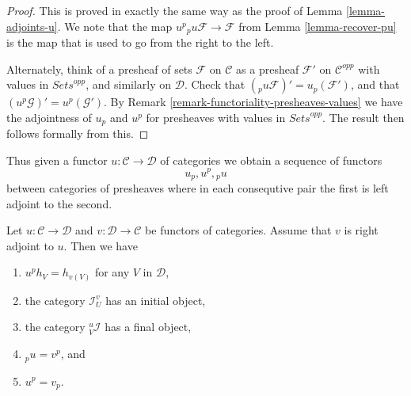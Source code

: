 \begin{proof}
This is proved in exactly the same way as the proof
of Lemma \ref{lemma-adjoints-u}. We note that the map
$u^p{}_pu \mathcal{F} \to \mathcal{F}$ from
Lemma \ref{lemma-recover-pu} is the map that
is used to go from the right to the left.

\medskip\noindent
Alternately, think
of a presheaf of sets $\mathcal{F}$ on $\mathcal{C}$ as a presheaf
$\mathcal{F}'$ on $\mathcal{C}^{opp}$ with values in $\textit{Sets}^{opp}$,
and similarly on $\mathcal{D}$.
Check that $({}_pu \mathcal{F})' = u_p(\mathcal{F}')$,
and that $(u^p\mathcal{G})' = u^p(\mathcal{G}')$.
By Remark \ref{remark-functoriality-presheaves-values}
we have the adjointness of $u_p$ and $u^p$ for
presheaves with values in $\textit{Sets}^{opp}$.
The result then follows formally from this.
\end{proof}

\noindent
Thus given a functor $u : \mathcal{C} \to \mathcal{D}$ of categories
we obtain a sequence of functors
$$
u_p, u^p, {}_pu
$$
between categories of presheaves where in each consequtive pair the
first is left adjoint to the second.

\begin{lemma}
\label{lemma-adjoint-functors}
Let $u : \mathcal{C} \to \mathcal{D}$ and $v : \mathcal{D} \to \mathcal{C}$
be functors of categories. Assume that $v$ is right adjoint to $u$.
Then we have
\begin{enumerate}
\item $u^ph_V = h_{v(V)}$ for any $V$ in $\mathcal{D}$,
\item the category $\mathcal{I}^v_U$ has an initial object,
\item the category ${}_V^u\mathcal{I}$ has a final object,
\item ${}_pu = v^p$, and
\item $u^p = v_p$.
\end{enumerate}
\end{lemma}

